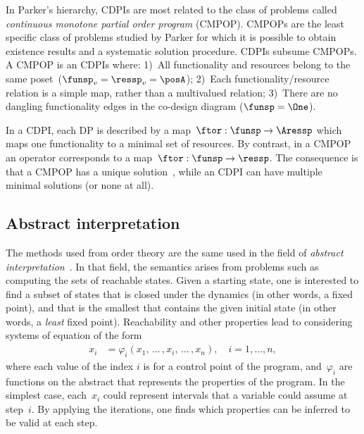 In Parker's hierarchy, CDPIs are most related to the class of problems called \emph{continuous monotone partial order program} (CMPOP).
CMPOPs are the least specific class of problems studied by Parker for which it is possible to obtain existence results and a systematic solution procedure.
CDPIs subsume CMPOPs.
A CMPOP is an CDPIs where: 1)~All functionality and resources belong to the same poset~\posA ($\funsp_{v}=\ressp_{v}=\posA$);
2)~Each functionality/resource relation is a simple map, rather than a multivalued relation; 3)~There are no dangling functionality edges in the co-design diagram ($\funsp=\One$).

In a CDPI, each DP is described by a  map~$\ftor:\funsp\rightarrow\Aressp$ which maps one functionality to a minimal set of resources.
By contrast, in a CMPOP an operator corresponds to a  map~$\ftor:\funsp\rightarrow\ressp$.
The consequence is that a CMPOP has a unique solution~\cite[Theorem 8]{parkerjr89partial},
while an CDPI can have multiple minimal solutions (or none at all).

\subsection{Abstract interpretation}

The methods used from order theory are the same used in the field of \emph{abstract interpretation}~\cite{cousot14abstract}.
In that field, the  semantics arises from problems such as computing the sets of reachable states.
Given a starting state,
one is interested to find a subset of states that is closed under the dynamics (in other words, a fixed point), and that is the smallest that contains the given initial state (in other words, a \emph{least} fixed point).
Reachability and other properties lead to considering systems of equation of the form
\begin{align}
    x_{i} & =\varphi_{i}(x_{1},\,\dots\,,x_{i},\,\dots\,,x_{n}),\quad i=1,\dots,n,\label{eq:ai}
\end{align}
where each value of the index $i$ is for a control point of the program, and~$\varphi_{i}$ are  functions on the abstract  that represents the properties of the program.
In the simplest case, each~$x_{i}$ could represent intervals that a variable could assume at step~$i$.
By applying the iterations, one finds which properties can be inferred to be valid at each step.


